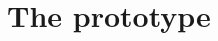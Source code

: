 \documentclass[../../thesis.tex]{subfiles}
\begin{document}
\chapter{The prototype}





\end{document}
